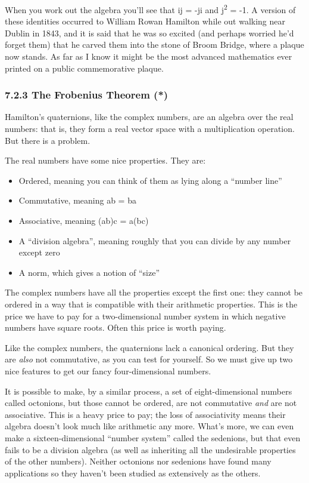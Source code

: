 \documentclass[oneside,english]{amsbook}
\numberwithin{section}{chapter}
\theoremstyle{plain}
\theoremstyle{definition}
\begin{document}
When you work out the algebra you'll see that ij = -ji and
j\textsuperscript{2} = -1. A version of these identities occurred to
William Rowan Hamilton while out walking near Dublin in 1843, and it is
said that he was so excited (and perhaps worried he'd forget them) that
he carved them into the stone of Broom Bridge, where a plaque now
stands. As far as I know it might be the most advanced mathematics ever
printed on a public commemorative plaque.

\subsubsection{7.2.3 The Frobenius Theorem
	(*)}\label{the-frobenius-theorem}

Hamilton's quaternions, like the complex numbers, are an algebra over
the real numbers: that is, they form a real vector space with a
multiplication operation. But there is a problem.

The real numbers have some nice properties. They are:

\begin{itemize}
	\item
	Ordered, meaning you can think of them as lying along a ``number
	line''
	\item
	Commutative, meaning ab = ba
	\item
	Associative, meaning (ab)c = a(bc)
	\item
	A ``division algebra'', meaning roughly that you can divide by any
	number except zero
	\item
	A norm, which gives a notion of ``size''
\end{itemize}

The complex numbers have all the properties except the first one: they
cannot be ordered in a way that is compatible with their arithmetic
properties. This is the price we have to pay for a two-dimensional
number system in which negative numbers have square roots. Often this
price is worth paying.

Like the complex numbers, the quaternions lack a canonical ordering. But
they are \emph{also} not commutative, as you can test for yourself. So
we must give up two nice features to get our fancy four-dimensional
numbers.

It is possible to make, by a similar process, a set of eight-dimensional
numbers called octonions, but those cannot be ordered, are not
commutative \emph{and} are not associative. This is a heavy price to
pay; the loss of associativity means their algebra doesn't look much
like arithmetic any more. What's more, we can even make a
sixteen-dimensional ``number system'' called the sedenions, but that
even fails to be a division algebra (as well as inheriting all the
undesirable properties of the other numbers). Neither octonions nor
sedenions have found many applications so they haven't been studied as
extensively as the others.
\end{document}
